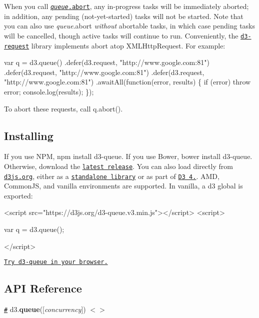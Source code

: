 When you call \href{#queue_abort}{\tt {\itshape queue}.abort}, any in-\/progress tasks will be immediately aborted; in addition, any pending (not-\/yet-\/started) tasks will not be started. Note that you can also use {\itshape queue}.abort {\itshape without} abortable tasks, in which case pending tasks will be cancelled, though active tasks will continue to run. Conveniently, the \href{https://github.com/d3/d3-request}{\tt d3-\/request} library implements abort atop X\+M\+L\+Http\+Request. For example\+:


\begin{DoxyCode}
var q = d3.queue()
    .defer(d3.request, "http://www.google.com:81")
    .defer(d3.request, "http://www.google.com:81")
    .defer(d3.request, "http://www.google.com:81")
    .awaitAll(function(error, results) \{
      if (error) throw error;
      console.log(results);
    \});
\end{DoxyCode}


To abort these requests, call {\ttfamily q.\+abort()}.

\subsection*{Installing}

If you use N\+PM, {\ttfamily npm install d3-\/queue}. If you use Bower, {\ttfamily bower install d3-\/queue}. Otherwise, download the \href{https://github.com/d3/d3-queue/releases/latest}{\tt latest release}. You can also load directly from \href{https://d3js.org}{\tt d3js.\+org}, either as a \href{https://d3js.org/d3-queue.v3.min.js}{\tt standalone library} or as part of \href{https://github.com/d3/d3}{\tt D3 4.}. A\+MD, Common\+JS, and vanilla environments are supported. In vanilla, a {\ttfamily d3} global is exported\+:


\begin{DoxyCode}
<script src="https://d3js.org/d3-queue.v3.min.js"></script>
<script>

var q = d3.queue();

</script>
\end{DoxyCode}


\href{https://tonicdev.com/npm/d3-queue}{\tt Try d3-\/queue in your browser.}

\subsection*{A\+PI Reference}

\href{#queue}{\tt \#} d3.{\bfseries queue}(\mbox{[}{\itshape concurrency}\mbox{]}) \href{https://github.com/d3/d3-queue/blob/master/src/queue.js}{\tt $<$$>$}

